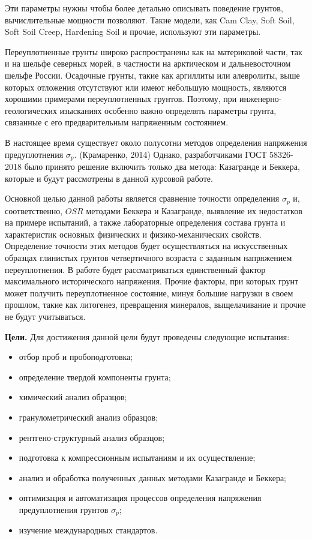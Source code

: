 Эти параметры нужны чтобы более детально описывать поведение грунтов, вычислительные мощности позволяют. 
Такие модели, как Cam Clay, Soft Soil, Soft Soil Creep, Hardening Soil и прочие, используют эти параметры. 

Переуплотненные грунты широко распространены как на материковой части, так и на шельфе северных морей, в частности на арктическом и дальневосточном шельфе России.
Осадочные грунты, такие как аргиллиты или алевролиты, выше которых отложения отсутствуют или имеют небольшую мощность, являются хорошими примерами переуплотненных грунтов.
Поэтому, при инженерно-геологических изысканиях особенно важно определять параметры грунта, связанные с его предварительным напряженным состоянием.

В настоящее время существует около полусотни  методов определения напряжения предуплотнения $\sigma_p$. (Крамаренко, 2014) \cite{kram2014}
Однако, разработчиками ГОСТ 58326-2018 было принято решение включить только два метода: Казагранде и Беккера, которые и будут рассмотрены в данной курсовой работе. 

Основной целью данной работы является сравнение точности определения $\sigma_p$ и, соответственно, $OSR$ методами Беккера и Казагранде, выявление их недостатков на примере испытаний, а также лабораторные определения состава грунта и характеристик основных физических и физико-механических свойств. 
Определение точности этих методов будет осуществляться на искусственных образцах глинистых грунтов четвертичного возраста с заданным напряжением переуплотнения. 
В работе будет рассматриваться единственный фактор максимального исторического напряжения. Прочие факторы, при которых грунт может получить переуплотненное состояние, минуя большие нагрузки в своем прошлом, такие как литогенез, превращения минералов, выщелачивание и прочие не будут учитываться.

\textbf{Цели.}
Для достижения данной цели будут проведены следующие испытания:
\begin{itemize}
    \item отбор проб и пробоподготовка; 
    \item определение твердой компоненты грунта;
    \item химический анализ образцов;
    \item гранулометрический анализ образцов;
    \item рентгено-структурный анализ образцов;
    \item подготовка к компрессионным испытаниям и их осуществление;
    \item анализ и обработка полученных данных методами Казагранде и Беккера;
    \item оптимизация и автоматизация процессов определения напряжения предуплотнения грунтов $\sigma_p$;
    \item изучение международных стандартов.
\end{itemize}

